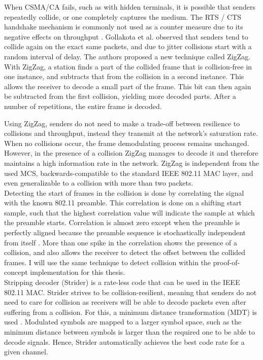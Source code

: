 When \gls{CSMA/CA} fails, such as with hidden terminals, it is possible that senders repeatedly collide, or one completely captures the medium. The \gls{RTS} / \gls{CTS} handshake mechanism is commonly not used as a counter measure due to its negative effects on throughput \cite{bianchi2000, gollakota2008, choi2013}. Gollakota et al. observed that senders tend to collide again on the exact same packets, and due to jitter collisions start with a random interval of delay. The authors proposed a new technique called ZigZag. With ZigZag, a station finds a part of the collided frame that is collision-free in one instance, and subtracts that from the collision in a second instance. This allows the receiver to decode a small part of the frame. This bit can then again be subtracted from the first collision, yielding more decoded parts. After a number of repetitions, the entire frame is decoded.

Using ZigZag, senders do not need to make a trade-off between resilience to collisions and throughput, instead they transmit at the network's saturation rate. When no collisions occur, the frame demodulating process remains unchanged. However, in the presence of a collision ZigZag manages to decode it and therefore maintains a high information rate in the network. ZigZag is independent from the used \gls{MCS}, backwards-compatible to the standard IEEE 802.11 MAC layer, and even generalizable to a collision with more than two packets.\\

Detecting the start of frames in the collision is done by correlating the signal with the known 802.11 preamble. This correlation is done on a shifting start sample, such that the highest correlation value will indicate the sample at which the preamble starts. Correlation is almost zero except when the preamble is perfectly aligned because the preamble sequence is stochastically independent from itself \cite{ieee2012}. More than one spike in the correlation shows the presence of a collision, and also allows the receiver to detect the offset between the collided frames. I will use the same technique to detect collision within the proof-of-concept implementation for this thesis.\\

Stripping decoder (Strider) \cite{gudipati2011} is a rate-less code that can be used in the IEEE 802.11 MAC. Strider strives to be collision-resilient, meaning that senders do not need to care for collision as receivers will be able to decode packets even after suffering from a collision. For this, a minimum distance transformation (MDT) is used \cite{gudipati2011}. Modulated symbols are mapped to a larger symbol space, such as the minimum distance between symbols is larger than the required one to be able to decode signals. Hence, Strider automatically achieves the best code rate for a given channel.


